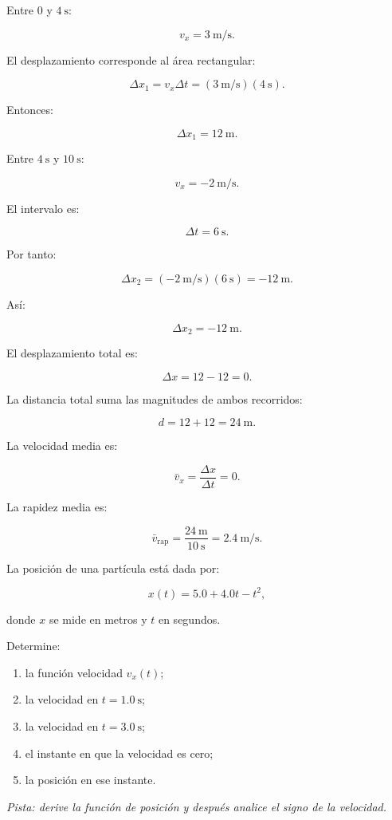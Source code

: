 \begin{explicacion}
Entre \(0\) y \(\SI{4}{\second}\):

\[
v_x=\SI{3}{\meter\per\second}.
\]

El desplazamiento corresponde al área rectangular:

\[
\Delta x_1
=
v_x\Delta t
=
(\SI{3}{\meter\per\second})
(\SI{4}{\second}).
\]

Entonces:

\[ \boxed{\Delta x_1=\SI{12}{\meter}}. \]

Entre \(\SI{4}{\second}\) y \(\SI{10}{\second}\):

\[
v_x=-\SI{2}{\meter\per\second}.
\]

El intervalo es:

\[ \Delta t=\SI{6}{\second}. \]

Por tanto:

\[
\Delta x_2
=
(-\SI{2}{\meter\per\second})
(\SI{6}{\second})
=
-\SI{12}{\meter}.
\]

Así:

\[ \boxed{\Delta x_2=-\SI{12}{\meter}}. \]

El desplazamiento total es:

\[
\Delta x
=
12-12
=
\boxed{0}.
\]

La distancia total suma las magnitudes de ambos recorridos:

\[
d
=
12+12
=
\boxed{\SI{24}{\meter}}.
\]

La velocidad media es:

\[
\bar{v}_x
=
\frac{\Delta x}{\Delta t}
=
0.
\]

La rapidez media es:

\[
\bar{v}_{\mathrm{rap}}
=
\frac{\SI{24}{\meter}}
{\SI{10}{\second}}
=
\boxed{\SI{2.4}{\meter\per\second}}.
\]
\end{explicacion}


\begin{ejercicio}
La posición de una partícula está dada por:

\[ x(t)=5.0+4.0t-t^2, \]

donde \(x\) se mide en metros y \(t\) en segundos.

Determine:

\begin{enumerate}[label=\alph*)]
    \item la función velocidad \(v_x(t)\);
    \item la velocidad en \(t=\SI{1.0}{\second}\);
    \item la velocidad en \(t=\SI{3.0}{\second}\);
    \item el instante en que la velocidad es cero;
    \item la posición en ese instante.
\end{enumerate}

\textit{Pista: derive la función de posición y después analice el signo de la velocidad.}
\end{ejercicio}


